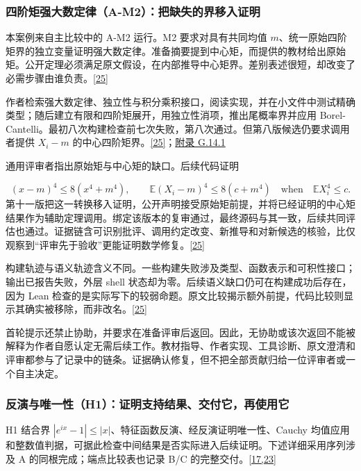 \subsubsection[四阶矩强大数定律（A-M2）：把缺失的界移入证明]{\texorpdfstring{\protect\hypertarget{r2-2}{}四阶矩强大数定律（A-M2）：把缺失的界移入证明}{四阶矩强大数定律（A-M2）：把缺失的界移入证明}}
本案例来自主比较中的 A-M2 运行。M2 要求对具有共同均值 $m$、统一原始四阶矩界的独立变量证明强大数定律。准备摘要提到中心矩，而提供的教材给出原始矩。公开定理必须满足原文假设，在内部推导中心矩界。差别表述很短，却改变了必需步骤由谁负责。\href{zh.pdf\#ref-25}{\mbox{[25]}}

作者检索强大数定律、独立性与积分乘积接口，阅读实现，并在小文件中测试精确类型；随后建立有限和四阶矩展开，用独立性消项，推出尾概率界并应用 Borel-Cantelli。最初八次构建检查前七次失败，第八次通过。但第八版候选仍要求调用者提供 $X_i-m$ 的中心四阶矩界。\href{zh.pdf\#ref-25}{\mbox{[25]}}；\href{zh-appendix.pdf\#g14-1}{附录 G.14.1}

通用评审者指出原始矩与中心矩的缺口。后续代码证明

\[
(x-m)^4\leq8(x^4+m^4),\qquad
\mathbb E(X_i-m)^4\leq8(c+m^4)
\quad\text{when}\quad\mathbb E X_i^4\leq c.
\]
第十一版把这一转换移入证明，公开声明接受原始矩前提，并将已经证明的中心矩结果作为辅助定理调用。绑定该版本的复审通过，最终源码与其一致，后续共同评估也通过。证据链含可识别批评、调用约定改变、新推导和对新候选的核验，比仅观察到“评审先于验收”更能证明数学修复。\href{zh.pdf\#ref-25}{\mbox{[25]}}

构建轨迹与语义轨迹含义不同。一些构建失败涉及类型、函数表示和可积性接口；输出已报告失败，外层 shell 状态却为零。后续语义缺口仍可在构建成功后存在，因为 Lean 检查的是实际写下的较弱命题。原文比较揭示额外前提，代码比较则显示其确实被移除，而非改名。\href{zh.pdf\#ref-25}{\mbox{[25]}}

首轮提示还禁止协助，并要求在准备评审后返回。因此，无协助或该次返回不能被解释为作者自愿认定无需后续工作。教材指导、作者实现、工具诊断、原文澄清和评审都参与了记录中的链条。证据确认修复，但不把全部贡献归给一位评审者或一个自主决定。

\subsubsection[反演与唯一性（H1）：证明支持结果、交付它，再使用它]{\texorpdfstring{\protect\hypertarget{r2-3}{}反演与唯一性（H1）：证明支持结果、交付它，再使用它}{反演与唯一性（H1）：证明支持结果、交付它，再使用它}}
H1 结合界 $|e^{ix}-1|\leq|x|$、特征函数反演、经反演证明唯一性、Cauchy 均值应用和整数值判据，可据此检查中间结果是否实际进入后续证明。下述详细采用序列涉及 A 的同根完成；端点比较表也记录 B/C 的完整交付。\href{zh.pdf\#ref-17}{\mbox{[17,23]}}


